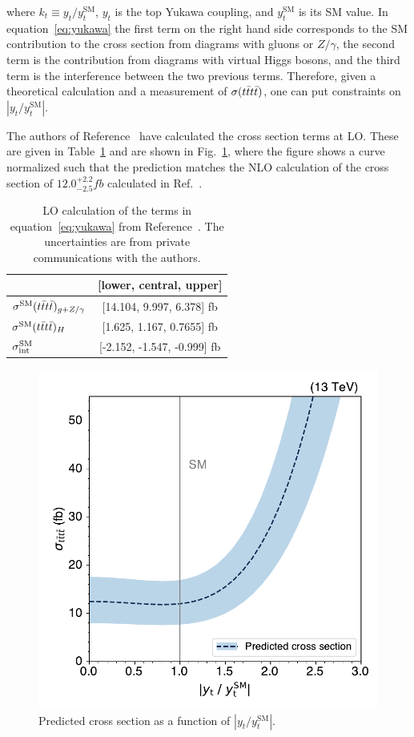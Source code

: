 \noindent where $k_t \equiv y_t/y_t^{\text{SM}}$, $y_t$ is the top Yukawa coupling, and $y_t^{\text{SM}}$ is its SM value.
In equation~\ref{eq:yukawa} the first term on the right hand side corresponds to the 
SM contribution to the cross section from diagrams with gluons or $Z/\gamma$, the second term
is the contribution from diagrams with virtual Higgs bosons, and the third term is the interference between
the two previous terms. Therefore, given a theoretical calculation and a measurement of $\sigma(t\bar{t}t\bar{t})$, one can put 
constraints on $|y_t/y_t^{\text{SM}}|$.

The authors of Reference~\cite{THEORY:TopYukawaTTTT} have calculated the cross section terms at LO.
These are given in Table~\ref{tab:yukawa} and are shown in Fig.~\ref{fig:cross_section_yt},
where the figure shows a curve normalized such that the prediction matches the NLO calculation of 
the \tttt cross section of $12.0^{+2.2}_{-2.5}\unit{fb}$ calculated in Ref.~\cite{THEORY:Frederix2017wme}.

\begin{table} [h!]
\begin{center}
\begin{tabular}{l|c}
\hline
   & [lower, central, upper] \\
\hline
$ \sigma^{\text{SM}}(t\bar{t}t\bar{t})_{g+Z/\gamma}  $ & [14.104, 9.997, 6.378] fb \\
$ \sigma^{\text{SM}}(t\bar{t}t\bar{t})_H $                  & [1.625, 1.167, 0.7655] fb \\
$\sigma^{\text{SM}}_{\rm int} $                   & [-2.152, -1.547, -0.999] fb \\
\hline
\end{tabular}
\caption{LO calculation of the terms in equation~\ref{eq:yukawa} from
Reference~\cite{THEORY:TopYukawaTTTT}.  
The uncertainties are from private communications with the authors.}
\label{tab:yukawa}
\end{center}
\end{table}


\begin{figure}[!htbp]
    \centering
    \includegraphics[width=0.75\linewidth]{figs/ftan/cross_section_yt.pdf}
    \caption{
        Predicted \tttt cross section as a function of $|y_t/y_t^{\text{SM}}|$.
    }
    \label{fig:cross_section_yt}
\end{figure}

